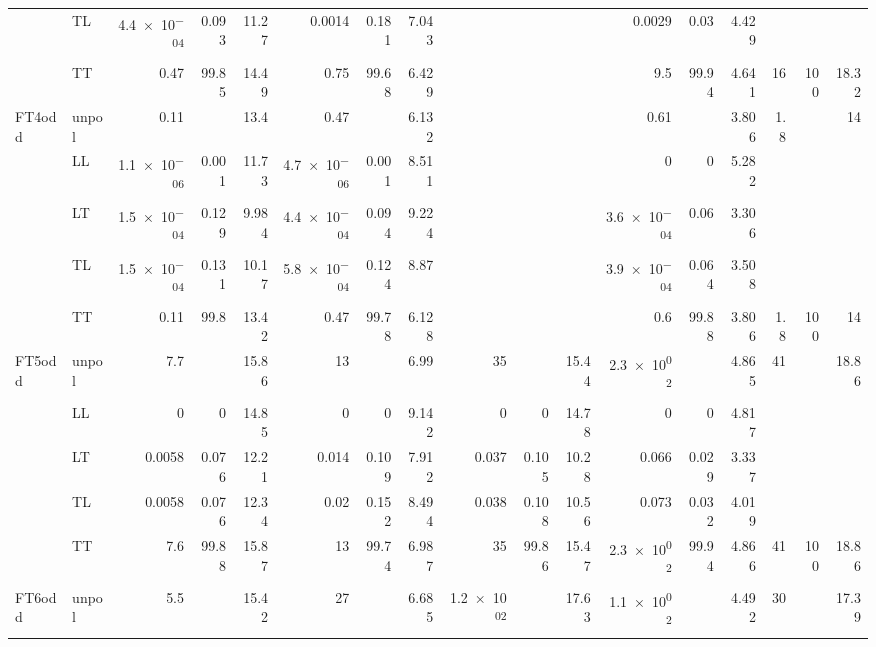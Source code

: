 \begin{table}
{\begin{tabular}{llrrrrrrrrrrrrrrr}
 & TL & \num{4.4e-04} & \num{0.093} & \num{11.27} & \num{0.0014} & \num{0.181} & \num{7.043} &  &  &  & \num{0.0029} & \num{0.03} & \num{4.429} &  &  &  \\
 & TT & \num{0.47} & \num{99.85} & \num{14.49} & \num{0.75} & \num{99.68} & \num{6.429} &  &  &  & \num{9.5} & \num{99.94} & \num{4.641} & \num{16} & \num{100} & \num{18.32} \\
\midrule
\multirow{5}{*}{FT4odd}
 & unpol & \num{0.11} &  & \num{13.4} & \num{0.47} &  & \num{6.132} &  &  &  & \num{0.61} &  & \num{3.806} & \num{1.8} &  & \num{14} \\
 & LL & \num{1.1e-06} & \num{0.001} & \num{11.73} & \num{4.7e-06} & \num{0.001} & \num{8.511} &  &  &  & \num{0} & \num{0} & \num{5.282} &  &  &  \\
 & LT & \num{1.5e-04} & \num{0.129} & \num{9.984} & \num{4.4e-04} & \num{0.094} & \num{9.224} &  &  &  & \num{3.6e-04} & \num{0.06} & \num{3.306} &  &  &  \\
 & TL & \num{1.5e-04} & \num{0.131} & \num{10.17} & \num{5.8e-04} & \num{0.124} & \num{8.87} &  &  &  & \num{3.9e-04} & \num{0.064} & \num{3.508} &  &  &  \\
 & TT & \num{0.11} & \num{99.8} & \num{13.42} & \num{0.47} & \num{99.78} & \num{6.128} &  &  &  & \num{0.6} & \num{99.88} & \num{3.806} & \num{1.8} & \num{100} & \num{14} \\
\midrule
\multirow{5}{*}{FT5odd}
 & unpol & \num{7.7} &  & \num{15.86} & \num{13} &  & \num{6.99} & \num{35} &  & \num{15.44} & \num{2.3e+02} &  & \num{4.865} & \num{41} &  & \num{18.86} \\
 & LL & \num{0} & \num{0} & \num{14.85} & \num{0} & \num{0} & \num{9.142} & \num{0} & \num{0} & \num{14.78} & \num{0} & \num{0} & \num{4.817} &  &  &  \\
 & LT & \num{0.0058} & \num{0.076} & \num{12.21} & \num{0.014} & \num{0.109} & \num{7.912} & \num{0.037} & \num{0.105} & \num{10.28} & \num{0.066} & \num{0.029} & \num{3.337} &  &  &  \\
 & TL & \num{0.0058} & \num{0.076} & \num{12.34} & \num{0.02} & \num{0.152} & \num{8.494} & \num{0.038} & \num{0.108} & \num{10.56} & \num{0.073} & \num{0.032} & \num{4.019} &  &  &  \\
 & TT & \num{7.6} & \num{99.88} & \num{15.87} & \num{13} & \num{99.74} & \num{6.987} & \num{35} & \num{99.86} & \num{15.47} & \num{2.3e+02} & \num{99.94} & \num{4.866} & \num{41} & \num{100} & \num{18.86} \\
\midrule
\multirow{5}{*}{FT6odd}
 & unpol & \num{5.5} &  & \num{15.42} & \num{27} &  & \num{6.685} & \num{1.2e+02} &  & \num{17.63} & \num{1.1e+02} &  & \num{4.492} & \num{30} &  & \num{17.39} \\

\end{tabular}}
\end{table}
